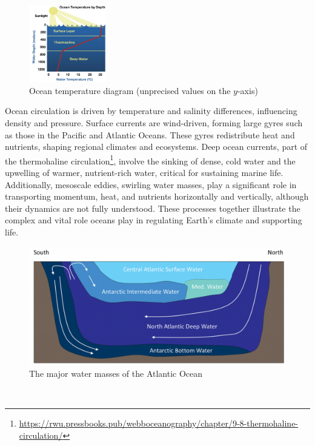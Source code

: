 \begin{figure}
	\begin{center}
		\includegraphics[width=0.3\textwidth]{uploads/Ocean T.png}
	\end{center}
	\caption{Ocean temperature diagram (unprecised values on the $y$-axis)}
	\label{}
\end{figure}



Ocean circulation is driven by temperature and salinity differences, influencing density and pressure. Surface currents are wind-driven, forming large gyres such as those in the Pacific and Atlantic Oceans. These gyres redistribute heat and nutrients, shaping regional climates and ecosystems. Deep ocean currents, part of the thermohaline circulation\footnote{\url{https://rwu.pressbooks.pub/webboceanography/chapter/9-8-thermohaline-circulation/}}, involve the sinking of dense, cold water and the upwelling of warmer, nutrient-rich water, critical for sustaining marine life.
Additionally, mesoscale eddies, swirling water masses, play a significant role in transporting momentum, heat, and nutrients horizontally and vertically, although their dynamics are not fully understood. These processes together illustrate the complex and vital role oceans play in regulating Earth's climate and supporting life.
\begin{figure}[htbp]
	\centering
	\includegraphics[width=0.5\linewidth]{uploads/atlocean.png}
	\caption{The major water masses of the Atlantic Ocean}
	\label{fig:enter-label}
\end{figure}
\\
[0.1cm]

